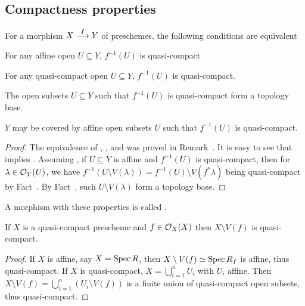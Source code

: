 \documentclass[a4paper,parskip=half,numbers=enddot, DIV=12]{scrreprt}
\begin{document}
\subsection{Compactness properties}
\begin{fact}
    For a morphism $X\morphism[f] Y$ of preschemes, the following conditions are equivalent
    \begin{alphanumerate}
    \item 
        For any affine open $U\subseteq Y$, $f^{-1}(U)$ is quasi-compact
    \item 
        For any quasi-compact open $U\subseteq Y$, $f^{-1}(U)$ is quasi-compact.
    \item 
        The open subsets $U\subseteq Y$ such that $f^{-1}(U)$ is quasi-compact form a topology base.
    \item 
        $Y$ may be covered by affine open subsets $U$ such that $f^{-1}(U)$ is quasi-compact.
    \end{alphanumerate}
\end{fact}
\begin{proof}
	The equivalence of , , and  was proved in Remark~. It is easy to see that  implies . Assuming , if $U\subseteq Y$ is affine and $f^{-1}(U)$ is quasi-compact, then for $\lambda\in \mathcal{O}_Y(U)$, we have $f^{-1}(U\setminus V(\lambda)) = f^{-1}(U) \setminus  V(f^*\lambda)$ being quasi-compact by Fact~. By Fact~, such $U\setminus V(\lambda)$ form a topology base.
\end{proof}
\begin{defi} 
    A morphism with these properties is called .
\end{defi}
\begin{fact}
    If $X$ is a quasi-compact prescheme and $f\in \mathcal{O}_X(X)$ then $X\setminus V(f)$ is quasi-compact.
\end{fact}
\begin{proof}
    If $X$ is affine, say $X=\operatorname{Spec} R$, then $X\setminus V(f) \simeq \operatorname{Spec} R_f$ is affine, thus quasi-compact. If $X$ is quasi-compact, $X=\bigcup_{i=1}^n U_i$ with $U_i$ affine. Then $X\setminus V(f) = \bigcup_{i=1}^n(U_i\setminus V(f))$ is a finite union of quasi-compact open subsets, thus quasi-compact.
\end{proof}
\end{document}
